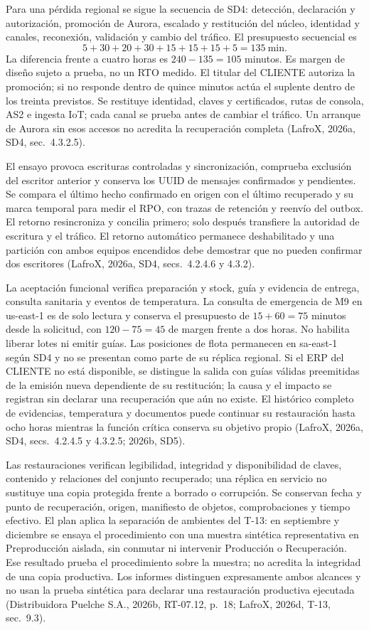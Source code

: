 Para una pérdida regional se sigue la secuencia de SD4: detección, declaración y autorización, promoción de Aurora, escalado y restitución del núcleo, identidad y canales, reconexión, validación y cambio del tráfico. El presupuesto secuencial es
\[
5+30+20+30+15+15+15+5=135\ \text{min}.
\]
La diferencia frente a cuatro horas es $240-135=105$ minutos. Es margen de diseño sujeto a prueba, no un RTO medido. El titular del CLIENTE autoriza la promoción; si no responde dentro de quince minutos actúa el suplente dentro de los treinta previstos. Se restituye identidad, claves y certificados, rutas de consola, AS2 e ingesta IoT; cada canal se prueba antes de cambiar el tráfico. Un arranque de Aurora sin esos accesos no acredita la recuperación completa (LafroX, 2026a, SD4, sec.~4.3.2.5).

El ensayo provoca escrituras controladas y sincronización, comprueba exclusión del escritor anterior y conserva los UUID de mensajes confirmados y pendientes. Se compara el último hecho confirmado en origen con el último recuperado y su marca temporal para medir el RPO, con trazas de retención y reenvío del outbox. El retorno resincroniza y concilia primero; solo después transfiere la autoridad de escritura y el tráfico. El retorno automático permanece deshabilitado y una partición con ambos equipos encendidos debe demostrar que no pueden confirmar dos escritores (LafroX, 2026a, SD4, secs.~4.2.4.6 y 4.3.2).

La aceptación funcional verifica preparación y stock, guía y evidencia de entrega, consulta sanitaria y eventos de temperatura. La consulta de emergencia de M9 en us-east-1 es de solo lectura y conserva el presupuesto de $15+60=75$ minutos desde la solicitud, con $120-75=45$ de margen frente a dos horas. No habilita liberar lotes ni emitir guías. Las posiciones de flota permanecen en sa-east-1 según SD4 y no se presentan como parte de su réplica regional. Si el ERP del CLIENTE no está disponible, se distingue la salida con guías válidas preemitidas de la emisión nueva dependiente de su restitución; la causa y el impacto se registran sin declarar una recuperación que aún no existe. El histórico completo de evidencias, temperatura y documentos puede continuar su restauración hasta ocho horas mientras la función crítica conserva su objetivo propio (LafroX, 2026a, SD4, secs.~4.2.4.5 y 4.3.2.5; 2026b, SD5).

Las restauraciones verifican legibilidad, integridad y disponibilidad de claves, contenido y relaciones del conjunto recuperado; una réplica en servicio no sustituye una copia protegida frente a borrado o corrupción. Se conservan fecha y punto de recuperación, origen, manifiesto de objetos, comprobaciones y tiempo efectivo. El plan aplica la separación de ambientes del T-13: en septiembre y diciembre se ensaya el procedimiento con una muestra sintética representativa en Preproducción aislada, sin conmutar ni intervenir Producción o Recuperación. Ese resultado prueba el procedimiento sobre la muestra; no acredita la integridad de una copia productiva. Los informes distinguen expresamente ambos alcances y no usan la prueba sintética para declarar una restauración productiva ejecutada (Distribuidora Puelche S.A., 2026b, RT-07.12, p.~18; LafroX, 2026d, T-13, sec.~9.3).

